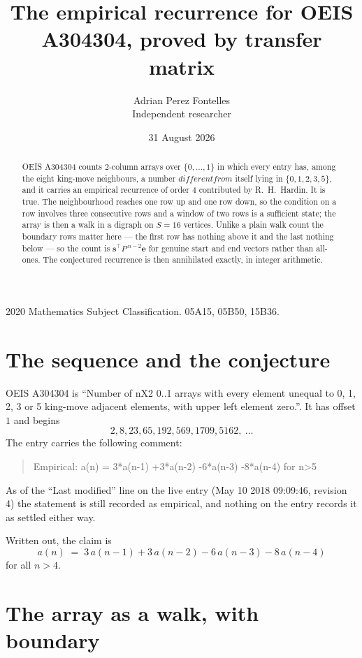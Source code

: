 \documentclass[11pt,a4paper]{article}
\title{The empirical recurrence for OEIS A304304, proved by transfer matrix}
\author{Adrian Perez Fontelles\\ \small Independent researcher}
\date{31 August 2026}
\theoremstyle{plain}
\theoremstyle{definition}
\begin{document}
\maketitle

\begin{abstract}
OEIS A304304 counts $2$-column arrays over $\{0,\dots,1\}$ in which every entry has,
among the eight king-move neighbours, a number $different from$ itself lying in $\{0,1,2,3,5\}$, and it carries an empirical
recurrence of order $4$ contributed by R.~H.~Hardin. It is true. The neighbourhood
reaches one row up and one row down, so the condition on a row involves three consecutive
rows and a window of two rows is a sufficient state; the array is then a walk in a digraph
on $S=16$ vertices. Unlike a plain walk count the boundary rows matter here --- the first
row has nothing above it and the last nothing below --- so the count is
$\mathbf{s}^{\!\top}P^{\,n-2}\mathbf{e}$ for genuine start and end vectors rather than
all-ones. The conjectured recurrence is then annihilated exactly, in integer arithmetic.
\end{abstract}

\noindent\small 2020 Mathematics Subject Classification. 05A15, 05B50, 15B36.\normalsize

\section{The sequence and the conjecture}

OEIS A304304 is ``Number of nX2 0..1 arrays with every element unequal to 0, 1, 2, 3 or 5 king-move adjacent elements, with upper left element zero.''. It has offset
$1$ and begins
\[
2, 8, 23, 65, 192, 569, 1709, 5162,\ \dots
\]
The entry carries the following comment:
\begin{quote}\small
Empirical: a(n) = 3*a(n-1) +3*a(n-2) -6*a(n-3) -8*a(n-4) for n>5
\end{quote}
As of the ``Last modified'' line on the live entry (May 10 2018 09:09:46, revision
4) the statement is still recorded as empirical, and nothing on the entry
records it as settled either way.

Written out, the claim is
\begin{equation}\label{eq:conj}
a(n)\;=\;3\,a(n-1) + 3\,a(n-2) - 6\,a(n-3) - 8\,a(n-4)
\end{equation}
for all $n>4$.

\section{The array as a walk, with boundary}
\end{document}
